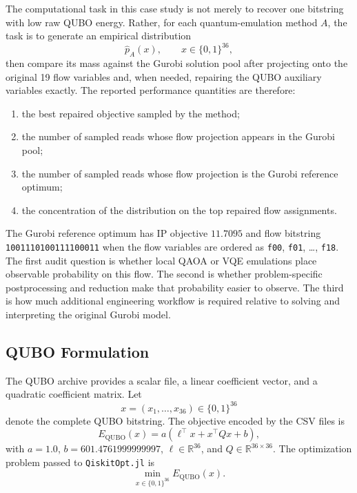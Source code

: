 The computational task in this case study is not merely to recover one bitstring
with low raw QUBO energy. Rather, for each quantum-emulation method $A$, the
task is to generate an empirical distribution
\[
    \widehat{p}_A(x), \qquad x \in \{0,1\}^{36},
\]
then compare its mass against the Gurobi solution pool after projecting onto the
original 19 flow variables and, when needed, repairing the QUBO auxiliary
variables exactly. The reported performance quantities are therefore:
\begin{enumerate}
    \item the best repaired objective sampled by the method;
    \item the number of sampled reads whose flow projection appears in the
    Gurobi pool;
    \item the number of sampled reads whose flow projection is the Gurobi reference
    optimum;
    \item the concentration of the distribution on the top repaired flow
    assignments.
\end{enumerate}

The Gurobi reference optimum has IP objective $11.7095$ and flow bitstring
\texttt{1001110100111100011} when the flow variables are ordered as
\texttt{f00}, \texttt{f01}, \ldots, \texttt{f18}. The first audit question is
whether local QAOA or VQE emulations place observable probability on this flow.
The second is whether problem-specific postprocessing and reduction make that
probability easier to observe. The third is how much additional engineering
workflow is required relative to solving and interpreting the original Gurobi
model.

\subsection{QUBO Formulation}
\label{subsec:ds-mfg-qubo-formulation}

The QUBO archive provides a scalar file, a linear coefficient vector, and a
quadratic coefficient matrix. Let
\[
    x = (x_1,\ldots,x_{36}) \in \{0,1\}^{36}
\]
denote the complete QUBO bitstring. The objective encoded by the CSV files is
\begin{equation}
    E_{\mathrm{QUBO}}(x)
    =
    a\left(
        \ell^\top x + x^\top Qx + b
    \right),
    \label{eq:ds-mfg-full-qubo}
\end{equation}
with $a=1.0$, $b=601.4761999999997$, $\ell \in \mathbb{R}^{36}$, and
$Q \in \mathbb{R}^{36 \times 36}$. The optimization problem passed to
\texttt{QiskitOpt.jl} is
\begin{equation}
    \min_{x \in \{0,1\}^{36}} E_{\mathrm{QUBO}}(x).
    \label{eq:ds-mfg-full-qubo-problem}
\end{equation}

